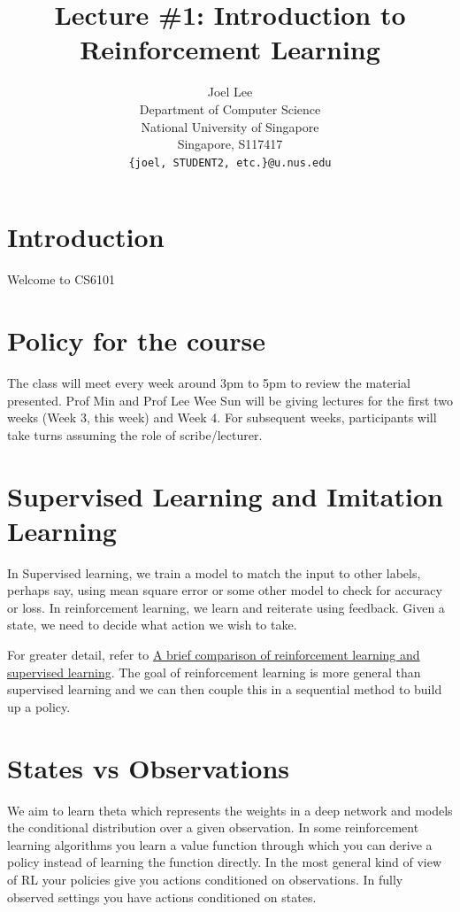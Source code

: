 \documentclass{article}
\title{Lecture \#1: Introduction to Reinforcement Learning}
\author{
  Joel Lee\\
  Department of Computer Science\\
  National University of Singapore\\
  Singapore, S117417 \\
  \texttt{\{joel, STUDENT2, etc.\}@u.nus.edu} \\
}
\begin{document}
\maketitle

\section{Introduction}
Welcome to CS6101

\section{Policy for the course}
The class will meet every week around 3pm to 5pm to review the
material presented. Prof Min and Prof Lee Wee Sun will be giving
lectures for the first two weeks (Week 3, this week) and Week 4. For
subsequent weeks, participants will take turns assuming the role of
scribe/lecturer.

\section{Supervised Learning and Imitation Learning}

In Supervised learning, we train a model to match the input to other
labels, perhaps say, using mean square error or some other model to
check for accuracy or loss. In reinforcement learning, we learn and
reiterate using feedback. Given a state, we need to decide what action
we wish to take.


For greater detail, refer to
\href{https://hackernoon.com/reinforcement-learning-and-supervised-learning-a-brief-comparison-1b6d68c45ffa}{A brief comparison of reinforcement learning and supervised learning}. The goal of reinforcement learning is more general than supervised learning and we can then couple this in a sequential method to build
up a policy.


\section{States vs Observations}
We aim to learn theta which represents the weights in a deep network and models the conditional distribution over a given observation. In some reinforcement learning algorithms you learn a value function through which you can derive a policy instead of learning the function directly.
In the most general kind of view of RL your policies give you actions conditioned on observations. In fully observed settings you have actions conditioned on states.
\end{document}
